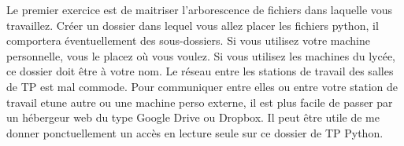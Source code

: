 Le premier exercice est de maitriser l'arborescence de fichiers dans laquelle vous travaillez. Créer un dossier dans lequel vous allez placer les fichiers python, il comportera éventuellement des sous-dossiers. \newline
Si vous utilisez votre machine personnelle, vous le placez où vous voulez. Si vous utilisez les machines du lycée, ce dossier doit être à votre nom.\newline
Le réseau entre les stations de travail des salles de TP est mal commode. Pour communiquer entre elles ou entre votre station de travail etune autre ou une machine perso externe, il est plus facile de passer par un hébergeur web du type Google Drive ou Dropbox. Il peut être utile de me donner ponctuellement un accès en lecture seule sur ce dossier de TP Python.
